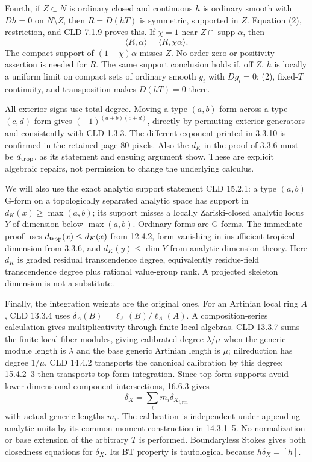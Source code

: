 \documentclass[11pt]{article}
\begin{document}
Fourth, if \(Z\subset N\) is ordinary closed and continuous \(h\) is ordinary smooth with \(Dh=0\) on \(N\setminus Z\), then \(R=D(hT)\) is symmetric, supported in \(Z\). Equation (2), restriction, and CLD 7.1.9 proves this. If \(\chi=1\) near \(Z\cap\operatorname{supp}\alpha\), then
\[
 \langle R,\alpha\rangle=\langle R,\chi\alpha\rangle.                      \tag{3}
\]
The compact support of \((1-\chi)\alpha\) misses \(Z\). No order-zero or positivity assertion is needed for \(R\). The same support conclusion holds if, off \(Z\), \(h\) is locally a uniform limit on compact sets of ordinary smooth \(g_i\) with \(Dg_i=0\): (2), fixed-\(T\) continuity, and transposition makes \(D(hT)=0\) there.

All exterior signs use total degree. Moving a type \((a,b)\)-form across a type \((c,d)\)-form gives \((-1)^{(a+b)(c+d)}\), directly by permuting exterior generators and consistently with CLD 1.3.3. The different exponent printed in 3.3.10 is confirmed in the retained page 80 pixels. Also the \(d_K\) in the proof of 3.3.6 must be \(d_{\rm trop}\), as its statement and ensuing argument show. These are explicit algebraic repairs, not permission to change the underlying calculus.

We will also use the exact analytic support statement CLD 15.2.1: a type \((a,b)\) G-form on a topologically separated analytic space has support in \(d_K(x)\geq\max(a,b)\); its support misses a locally Zariski-closed analytic locus \(Y\) of dimension below \(\max(a,b)\). Ordinary forms are G-forms. The immediate proof uses \(d_{\rm trop}(x)\leq d_K(x)\) from 12.4.2, form vanishing in insufficient tropical dimension from 3.3.6, and \(d_K(y)\leq\dim Y\) from analytic dimension theory. Here \(d_K\) is graded residual transcendence degree, equivalently residue-field transcendence degree plus rational value-group rank. A projected skeleton dimension is not a substitute.

Finally, the integration weights are the original ones. For an Artinian local ring \(A\), CLD 13.3.4 uses \(\delta_A(B)=\ell_A(B)/\ell_A(A)\). A composition-series calculation gives multiplicativity through finite local algebras. CLD 13.3.7 sums the finite local fiber modules, giving calibrated degree \(\lambda/\mu\) when the generic module length is \(\lambda\) and the base generic Artinian length is \(\mu\); nilreduction has degree \(1/\mu\). CLD 14.4.2 transports the canonical calibration by this degree; 15.4.2--3 then transports top-form integration. Since top-form supports avoid lower-dimensional component intersections, 16.6.3 gives
\[
 \delta_X=\sum_i m_i\delta_{X_{i,\mathrm{red}}}
\]
with actual generic lengths \(m_i\). The calibration is independent under appending analytic units by its common-moment construction in 14.3.1--5. No normalization or base extension of the arbitrary \(T\) is performed. Boundaryless Stokes gives both closedness equations for \(\delta_X\). Its BT property is tautological because \(h\delta_X=[h]\).
\end{document}
